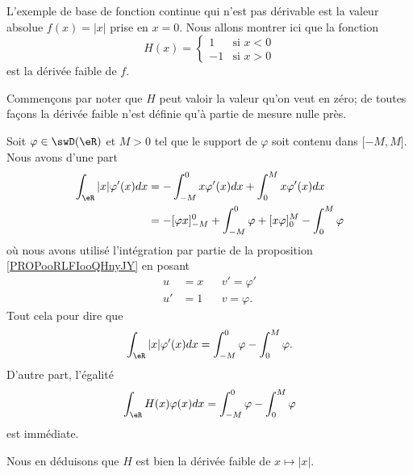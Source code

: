 \begin{example}
    L'exemple de base de fonction continue qui n'est pas dérivable est la valeur absolue \( f(x)=| x |\) prise en \( x=0\). Nous allons montrer ici que la fonction
    \begin{equation}
        H(x)=\begin{cases}
            1    &   \text{si } x<0\\
            -1    &    \text{si } x>0
        \end{cases}
    \end{equation}
    est la dérivée faible de \( f\).

    Commençons par noter que \( H\) peut valoir la valeur qu'on veut en zéro; de toutes façons la dérivée faible n'est définie qu'à partie de mesure nulle près.

    Soit \( \varphi\in \swD(\eR)\) et \( M>0\) tel que le support de \( \varphi\) soit contenu dans \( \mathopen[ -M , M \mathclose]\). Nous avons d'une part
    \begin{subequations}
        \begin{align}
            \int_{\eR}| x |\varphi'(x)dx&=-\int_{-M}^0x\varphi'(x)dx+\int_0^Mx\varphi'(x)dx\\
            &=-[\varphi x]_{-M}^0+\int_{-M}^0\varphi+[x\varphi]_0^M-\int_0^M\varphi
        \end{align}
    \end{subequations}
    où nous avons utilisé l'intégration par partie de la proposition \ref{PROPooRLFIooQHnyJY} en posant
    \begin{subequations}
        \begin{align}
            u&=x&&v'=\varphi'\\
            u'&=1&&v=\varphi.
        \end{align}
    \end{subequations}
    Tout cela pour dire que
    \begin{equation}
        \int_{\eR}| x |\varphi'(x)dx=\int_{-M}^0\varphi-\int_0^M\varphi.
    \end{equation}
    D'autre part, l'égalité
    \begin{equation}
        \int_{\eR}H(x)\varphi(x)dx= \int_{-M}^0\varphi-\int_0^M\varphi
    \end{equation}
    est immédiate.

    Nous en déduisons que \( H\) est bien la dérivée faible de \( x\mapsto | x |\).
\end{example}

